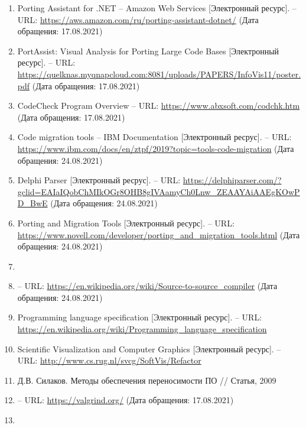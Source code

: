 \documentclass{article}
\begin{document}
\begin{enumerate}
		\item{Porting Assistant for .NET -- Amazon Web Services [Электронный ресурс]. -- URL: \url{https://aws.amazon.com/ru/porting-assistant-dotnet/}  (Дата обращения: 17.08.2021)}
		\item{PortAssist: Visual Analysis for Porting Large Code Bases [Электронный ресурс]. -- URL: \url{https://quelknas.myqnapcloud.com:8081/uploads/PAPERS/InfoVis11/poster.pdf} (Дата обращения: 17.08.2021)}
		\item{CodeCheck Program Overview -- URL: \url{https://www.abxsoft.com/codchk.htm}  (Дата обращения: 17.08.2021)}
		\item{Code migration tools -- IBM Documentation [Электронный ресрус]. -- URL: \url{https://www.ibm.com/docs/en/ztpf/2019?topic=tools-code-migration} (Дата обращения: 24.08.2021)}
		\item{Delphi Parser [Электронный ресрус]. -- URL: \url{https://delphiparser.com/?gclid=EAIaIQobChMIkOGr8OHB8gIVAamyCh0Lnw_ZEAAYAiAAEgKOwPD_BwE} (Дата обращения: 24.08.2021)}
		\item{Porting and Migration Tools [Электронный ресурс]. -- URL: \url{https://www.novell.com/developer/porting_and_migration_tools.html} (Дата обращения: 24.08.2021)}
		\item{}
		\item{ -- URL: \url{https://en.wikipedia.org/wiki/Source-to-source_compiler} (Дата обращения: 24.08.2021)}

		
		\item{Programming language specification [Электронный ресурс]. -- URL: \url{https://en.wikipedia.org/wiki/Programming_language_specification} }
		\item{Scientific Visualization and Computer Graphics [Электронный ресурс]. -- URL: \url{http://www.cs.rug.nl/svcg/SoftVis/Refactor} }
			
		\item{Д.В. Силаков. Методы обеспечения переносимости ПО // Статья, 2009}

		\item{-- URL: \url{https://valgrind.org/} (Дата обращения: 17.08.2021)}

		\item{}
	\end{enumerate}
	
\end{document}
